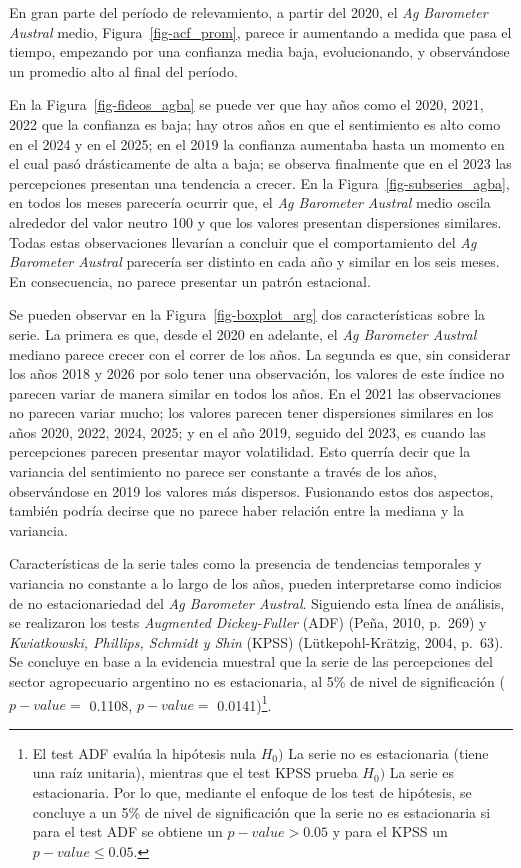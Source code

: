 \documentclass[12pt]{article}
\begin{document}
En gran parte del período de relevamiento, a partir del 2020, el
\emph{Ag Barometer Austral} medio, Figura~\ref{fig-acf_prom}, parece ir
aumentando a medida que pasa el tiempo, empezando por una confianza
media baja, evolucionando, y observándose un promedio alto al final del
período.

En la Figura~\ref{fig-fideos_agba} se puede ver que hay años como el
2020, 2021, 2022 que la confianza es baja; hay otros años en que el
sentimiento es alto como en el 2024 y en el 2025; en el 2019 la
confianza aumentaba hasta un momento en el cual pasó drásticamente de
alta a baja; se observa finalmente que en el 2023 las percepciones
presentan una tendencia a crecer. En la Figura~\ref{fig-subseries_agba},
en todos los meses parecería ocurrir que, el \emph{Ag Barometer Austral}
medio oscila alrededor del valor neutro 100 y que los valores presentan
dispersiones similares. Todas estas observaciones llevarían a concluir
que el comportamiento del \emph{Ag Barometer Austral} parecería ser
distinto en cada año y similar en los seis meses. En consecuencia, no
parece presentar un patrón estacional.

Se pueden observar en la Figura~\ref{fig-boxplot_arg} dos
características sobre la serie. La primera es que, desde el 2020 en
adelante, el \emph{Ag Barometer Austral} mediano parece crecer con el
correr de los años. La segunda es que, sin considerar los años 2018 y
2026 por solo tener una observación, los valores de este índice no
parecen variar de manera similar en todos los años. En el 2021 las
observaciones no parecen variar mucho; los valores parecen tener
dispersiones similares en los años 2020, 2022, 2024, 2025; y en el año
2019, seguido del 2023, es cuando las percepciones parecen presentar
mayor volatilidad. Esto querría decir que la variancia del sentimiento
no parece ser constante a través de los años, observándose en 2019 los
valores más dispersos. Fusionando estos dos aspectos, también podría
decirse que no parece haber relación entre la mediana y la variancia.

Características de la serie tales como la presencia de tendencias
temporales y variancia no constante a lo largo de los años, pueden
interpretarse como indicios de no estacionariedad del \emph{Ag Barometer
Austral}. Siguiendo esta línea de análisis, se realizaron los tests
\emph{Augmented Dickey-Fuller} (ADF) (Peña, 2010, p.~269) y
\emph{Kwiatkowski, Phillips, Schmidt y Shin} (KPSS) (Lütkepohl-Krätzig,
2004, p.~63). Se concluye en base a la evidencia muestral que la serie
de las percepciones del sector agropecuario argentino no es
estacionaria, al 5\% de nivel de significación (\(p-value=\) 0.1108,
\(p-value=\) 0.0141)\footnote{El test ADF evalúa la hipótesis nula
  \(H_0)\) La serie no es estacionaria (tiene una raíz unitaria),
  mientras que el test KPSS prueba \(H_0)\) La serie es estacionaria.
  Por lo que, mediante el enfoque de los test de hipótesis, se concluye
  a un 5\% de nivel de significación que la serie no es estacionaria si
  para el test ADF se obtiene un \(p-value>0.05\) y para el KPSS un
  \(p-value \leq 0.05\).}.
\end{document}
